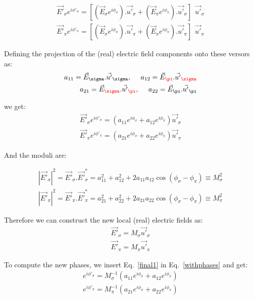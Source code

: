 \documentclass{iucr}
\newcommand{\inred}[1]{{\color{red}#1}}
\begin{document}
\begin{eqnarray}
\vec{E'}_\sigma e^{i \phi'_\sigma} = [(\vec{E}_\sigma e^{i \phi_\sigma}).\vec{u'}_\sigma + (\vec{E}_\pi e^{i \phi_\pi}).\vec{u'}_\sigma ] 
  ~~\vec{u'}_\sigma  \\ 
\vec{E'}_\pi e^{i \phi'_\pi} = [(\vec{E}_\sigma e^{i \phi_\sigma}).\vec{u'}_\pi + (\vec{E}_\pi e^{i \phi_\pi}).\vec{u'}_\pi ] 
  ~~\vec{u'}_\pi 
\end{eqnarray}


Defining the projection of the (real) electric field components onto these versors as: 
\begin{eqnarray}
a_{11} = \vec{E}_\sigma . \vec{u'}_\sigma, ~~~~ 
a_{12} = \vec{E}_\inred{\pi} . \vec{u'}_\inred{\sigma} \nonumber \\
a_{21} = \vec{E}_\inred{\sigma} . \vec{u'}_\inred{\pi}, ~~~~
a_{22} = \vec{E}_\pi . \vec{u'}_\pi 
\end{eqnarray}

we get:
\begin{eqnarray}
\label{withphases}
\vec{E'}_\sigma e^{i \phi'_\sigma} = (a_{11} e^{i \phi_\sigma} + a_{12} e^{i \phi_\pi}) \vec{u'}_\sigma \nonumber \\ 
\vec{E'}_\pi e^{i \phi'_\pi} =    (a_{21} e^{i \phi_\sigma} + a_{22} e^{i \phi_\pi}) \vec{u'}_\pi
\end{eqnarray}

And the moduli are: 

\begin{eqnarray}
|\vec{E'}_\sigma|^2 = \vec{E'}_\sigma . \vec{E'}_\sigma^*  = 
a_{11}^2 + a_{12}^2 + 2 a_{11} a_{12} \cos(\phi_\sigma-\phi_\pi) \equiv
M_\sigma^2 \nonumber \\ 
|\vec{E'}_\pi|^2    = \vec{E'}_\pi    . \vec{E'}_\pi^*     = 
a_{21}^2 + a_{22}^2 + 2 a_{21} a_{22} \cos(\phi_\sigma-\phi_\pi) \equiv
M_\pi^2
\end{eqnarray}

Therefore we can construct the new local (real) electric fields as: 
\begin{eqnarray}
\label{final1}
\vec{E'}_\sigma = M_\sigma \vec{u'}_\sigma  \nonumber \\ 
\vec{E'}_\pi = M_\pi \vec{u'}_\pi  
\end{eqnarray}

To compute the new phases, we insert Eq.~\ref{final1} in Eq.~\ref{withphases} and get: 
\begin{eqnarray}
e^{i \phi'_\sigma} = M_\sigma^{-1} (a_{11} e^{i \phi_\sigma} + a_{12} e^{i \phi_\pi})  \nonumber \\ 
e^{i \phi'_\pi} =  M_\pi^{-1}      (a_{21} e^{i \phi_\sigma} + a_{22} e^{i \phi_\pi}) 
\end{eqnarray}
\end{document}
